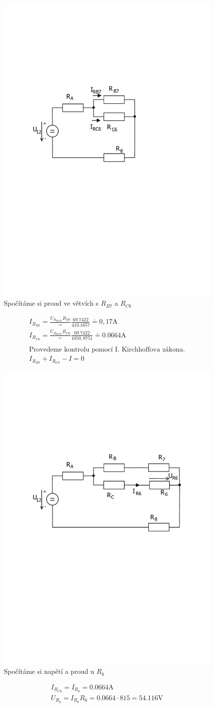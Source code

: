 	\begin{figure}[H]
		\center\includegraphics[width=0.6\linewidth]{obr/1_9}
		\caption{Spočítáme si proud ve větvích s $R_{B7}$ a  $R_{C6}$}
	\end{figure}
	\begin{gather*}
		I_{R_{B7}} = \frac{U_{R_{BC67}}{R_{B7}}} = \frac{69.7422}{410.1657} \doteq 0,17 \text{A} \\
		I_{R_{C6}} = \frac{U_{R_{BC67}}{R_{C6}}} = \frac{69.7422}{1050,8751} \doteq 0.0664 \text{A} \\
		\\
		\text{Provedeme kontrolu pomocí I. Kirchhoffova zákona.}  \\
		I_{R_{B7}} + I_{R_{C6}} - I  =  0 
	\end{gather*}

	\begin{figure}[H]
		\center\includegraphics[width=0.6\linewidth]{obr/1_10}
		\caption{Spočítáme si napětí a proud u $R_6$}
	\end{figure}
	\begin{gather*}
		I_{R_{C6}} = I_{R_6} = 0.0664 \text{A} \\
		U_{R_6} = {I_{R_6} R_6} = {0.0664 \cdot 815} = 54.116  \text{V} \\
	\end{gather*}